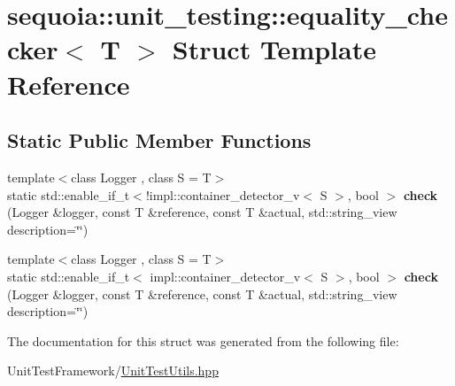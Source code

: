 \hypertarget{structsequoia_1_1unit__testing_1_1equality__checker}{}\section{sequoia\+::unit\+\_\+testing\+::equality\+\_\+checker$<$ T $>$ Struct Template Reference}
\label{structsequoia_1_1unit__testing_1_1equality__checker}
\subsection*{Static Public Member Functions}
\begin{DoxyCompactItemize}
\item 
\mbox{\label{structsequoia_1_1unit__testing_1_1equality__checker_a053438918d05c637920d2bcb3eca6e7a}} 
{\footnotesize template$<$class Logger , class S  = T$>$ }\\static std\+::enable\+\_\+if\+\_\+t$<$!impl\+::container\+\_\+detector\+\_\+v$<$ S $>$, bool $>$ {\bfseries check} (Logger \&logger, const T \&reference, const T \&actual, std\+::string\+\_\+view description=\char`\"{}\char`\"{})
\item 
\mbox{\label{structsequoia_1_1unit__testing_1_1equality__checker_a62abcbbc3cb4108d30540271d49fd069}} 
{\footnotesize template$<$class Logger , class S  = T$>$ }\\static std\+::enable\+\_\+if\+\_\+t$<$ impl\+::container\+\_\+detector\+\_\+v$<$ S $>$, bool $>$ {\bfseries check} (Logger \&logger, const T \&reference, const T \&actual, std\+::string\+\_\+view description=\char`\"{}\char`\"{})
\end{DoxyCompactItemize}


The documentation for this struct was generated from the following file\+:\begin{DoxyCompactItemize}
\item 
Unit\+Test\+Framework/\mbox{\hyperlink{_unit_test_utils_8hpp}{Unit\+Test\+Utils.\+hpp}}\end{DoxyCompactItemize}

